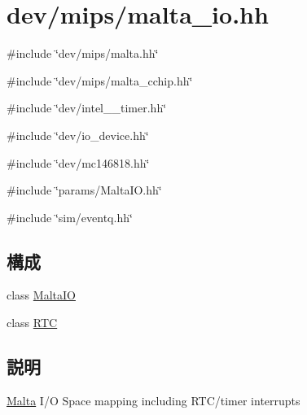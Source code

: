 \hypertarget{malta__io_8hh}{
\section{dev/mips/malta\_\-io.hh}
\label{malta__io_8hh}
}
{\ttfamily \#include \char`\"{}dev/mips/malta.hh\char`\"{}}\par
{\ttfamily \#include \char`\"{}dev/mips/malta\_\-cchip.hh\char`\"{}}\par
{\ttfamily \#include \char`\"{}dev/intel\_\_\-timer.hh\char`\"{}}\par
{\ttfamily \#include \char`\"{}dev/io\_\-device.hh\char`\"{}}\par
{\ttfamily \#include \char`\"{}dev/mc146818.hh\char`\"{}}\par
{\ttfamily \#include \char`\"{}params/MaltaIO.hh\char`\"{}}\par
{\ttfamily \#include \char`\"{}sim/eventq.hh\char`\"{}}\par
\subsection*{構成}
\begin{DoxyCompactItemize}
\item 
class \hyperlink{classMaltaIO}{MaltaIO}
\item 
class \hyperlink{classMaltaIO_1_1RTC}{RTC}
\end{DoxyCompactItemize}


\subsection{説明}
\hyperlink{classMalta}{Malta} I/O Space mapping including RTC/timer interrupts 
